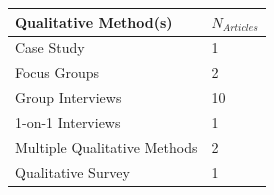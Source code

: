 \documentclass[]{tufte-handout}
\begin{document}
\begin{longtable}[]{@{}ll@{}}
\toprule
\begin{minipage}[b]{0.41\columnwidth}\raggedright\strut
Qualitative Method(s)\strut
\end{minipage} & \begin{minipage}[b]{0.21\columnwidth}\raggedright\strut
\(N_{Articles}\)\strut
\end{minipage}\tabularnewline
\midrule
\endhead
\begin{minipage}[t]{0.41\columnwidth}\raggedright\strut
Case Study\strut
\end{minipage} & \begin{minipage}[t]{0.21\columnwidth}\raggedright\strut
1\strut
\end{minipage}\tabularnewline
\begin{minipage}[t]{0.41\columnwidth}\raggedright\strut
Focus Groups\strut
\end{minipage} & \begin{minipage}[t]{0.21\columnwidth}\raggedright\strut
2\strut
\end{minipage}\tabularnewline
\begin{minipage}[t]{0.41\columnwidth}\raggedright\strut
Group Interviews\strut
\end{minipage} & \begin{minipage}[t]{0.21\columnwidth}\raggedright\strut
10\strut
\end{minipage}\tabularnewline
\begin{minipage}[t]{0.41\columnwidth}\raggedright\strut
1-on-1 Interviews\strut
\end{minipage} & \begin{minipage}[t]{0.21\columnwidth}\raggedright\strut
1\strut
\end{minipage}\tabularnewline
\begin{minipage}[t]{0.41\columnwidth}\raggedright\strut
Multiple Qualitative Methods\strut
\end{minipage} & \begin{minipage}[t]{0.21\columnwidth}\raggedright\strut
2\strut
\end{minipage}\tabularnewline
\begin{minipage}[t]{0.41\columnwidth}\raggedright\strut
Qualitative Survey\strut
\end{minipage} & \begin{minipage}[t]{0.21\columnwidth}\raggedright\strut
1\strut
\end{minipage}\tabularnewline
\bottomrule
\end{longtable}
\end{document}
